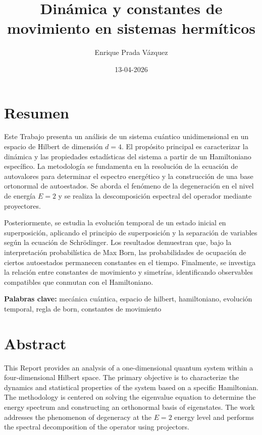 \documentclass[11pt,a4paper,spanish]{book}
\title{Dinámica y constantes de movimiento en sistemas hermíticos}
\author{Enrique Prada Vázquez}
\date{13-04-2026}
\begin{document}
\renewcommand{\listfigurename}{Índice de figuras}
\renewcommand{\listtablename}{Índice de tablas}
\renewcommand{\contentsname}{Índice de contenidos}
\renewcommand{\figurename}{Figura}
\renewcommand{\tablename}{Tabla} 

\maketitle
\frontmatter
\tableofcontents

\chapter{Resumen}
Este Trabajo presenta un análisis de un sistema cuántico unidimensional en un espacio de Hilbert de dimensión $d=4$. El propósito principal es caracterizar la dinámica y las propiedades estadísticas del sistema a partir de un Hamiltoniano específico. La metodología se fundamenta en la resolución de la ecuación de autovalores para determinar el espectro energético y la construcción de una base ortonormal de autoestados. Se aborda el fenómeno de la degeneración en el nivel de energía $E=2$ y se realiza la descomposición espectral del operador mediante proyectores. 

Posteriormente, se estudia la evolución temporal de un estado inicial en superposición, aplicando el principio de superposición y la separación de variables según la ecuación de Schrödinger. Los resultados demuestran que, bajo la interpretación probabilística de Max Born, las probabilidades de ocupación de ciertos autoestados permanecen constantes en el tiempo. Finalmente, se investiga la relación entre constantes de movimiento y simetrías, identificando observables compatibles que conmutan con el Hamiltoniano.

\vspace{0.5cm}
{\bf Palabras clave:} mecánica cuántica, espacio de hilbert, hamiltoniano, evolución temporal, regla de born, constantes de movimiento

\chapter{Abstract}
This Report provides an analysis of a one-dimensional quantum system within a four-dimensional Hilbert space. The primary objective is to characterize the dynamics and statistical properties of the system based on a specific Hamiltonian. The methodology is centered on solving the eigenvalue equation to determine the energy spectrum and constructing an orthonormal basis of eigenstates. The work addresses the phenomenon of degeneracy at the $E=2$ energy level and performs the spectral decomposition of the operator using projectors.
\end{document}
